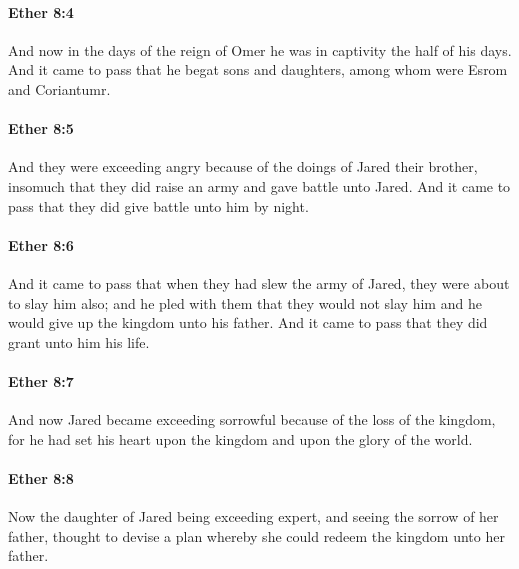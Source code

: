 		\paragraph{Ether 8:4} %
			\label{ETHER-8-4}

			And now in the days of the reign of Omer
			he was in captivity the half of his days.
			And it came to pass that he begat sons and daughters,
			among whom were Esrom and Coriantumr.

		\paragraph{Ether 8:5} %
			\label{ETHER-8-5}

			And they were exceeding angry because of the doings of Jared their brother,
			insomuch that they did raise an army and gave battle unto Jared.
			And it came to pass that they did give battle unto him by night.

		\paragraph{Ether 8:6} %
			\label{ETHER-8-6}

			And it came to pass that when they had slew the army of Jared,
			they were about to slay him also;
			and he pled with them that they would not slay him
			and he would give up the kingdom unto his father.
			And it came to pass that they did grant unto him his life.

		\paragraph{Ether 8:7} %
			\label{ETHER-8-7}

			And now Jared became exceeding sorrowful because of the loss of the kingdom,
			for he had set his heart upon the kingdom and upon the glory of the world.

		\paragraph{Ether 8:8} %
			\label{ETHER-8-8}

			Now the daughter of Jared being exceeding expert,
			and seeing the sorrow of her father,
			thought to devise a plan whereby she could redeem the kingdom unto her father.

